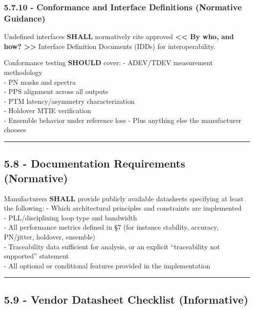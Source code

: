 \documentclass[
]{article}
\begin{document}
\subsubsection{5.7.10 - Conformance and Interface Definitions (Normative
Guidance)}\label{conformance-and-interface-definitions-normative-guidance}

Undefined interfaces \textbf{SHALL} normatively cite approved
\textbf{\textless\textless{} By who, and how?
\textgreater\textgreater{}} Interface Definition Documents (IDDs) for
interoperability.

Conformance testing \textbf{SHOULD} cover: - ADEV/TDEV measurement
methodology\\
- PN masks and spectra\\
- PPS alignment across all outputs\\
- PTM latency/asymmetry characterization\\
- Holdover MTIE verification\\
- Ensemble behavior under reference loss - Plus anything else the
manufacturer chooses

\begin{center}\rule{0.5\linewidth}{0.5pt}\end{center}

\subsection{5.8 - Documentation Requirements
(Normative)}\label{documentation-requirements-normative}

Manufacturers \textbf{SHALL} provide publicly available datasheets
specifying at least the following: - Which architectural principles and
constraints are implemented\\
- PLL/disciplining loop type and bandwidth\\
- All performance metrics defined in §7 (for instance stability,
accuracy, PN/jitter, holdover, ensemble)\\
- Traceability data sufficient for analysis, or an explicit
``traceability not supported'' statement\\
- All optional or conditional features provided in the implementation

\begin{center}\rule{0.5\linewidth}{0.5pt}\end{center}

\subsection{5.9 - Vendor Datasheet Checklist
(Informative)}\label{vendor-datasheet-checklist-informative}
\end{document}
